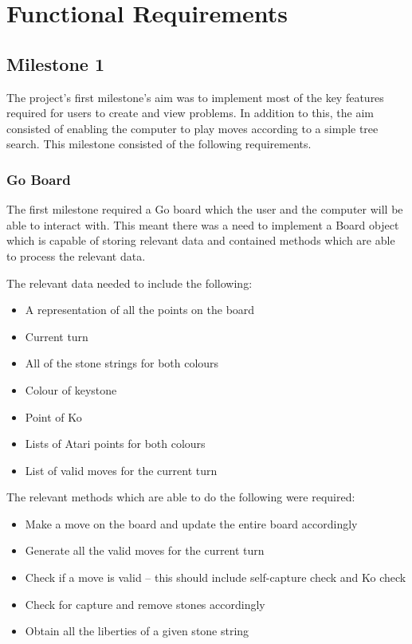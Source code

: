 \documentclass{l4proj}
\begin{document}
\section{Functional Requirements}

\subsection{Milestone 1}
The project's first milestone's aim was to implement most of the key features required for users to create and view problems. In addition to this, the aim consisted of enabling the computer to play moves according to a simple tree search. This milestone consisted of the following requirements.

\subsubsection{Go Board}
The first milestone required a Go board which the user and the computer will be able to interact with. This meant there was a need to implement a Board object which is capable of storing relevant data and contained methods which are able to process the relevant data.

The relevant data needed to include the following:
\begin{itemize}
\item A representation of all the points on the board
\item Current turn
\item All of the stone strings for both colours
\item Colour of keystone
\item Point of Ko
\item Lists of Atari points for both colours
\item List of valid moves for the current turn
\end{itemize}

The relevant methods which are able to do the following were required:
\begin{itemize}
\item Make a move on the board and update the entire board accordingly
\item Generate all the valid moves for the current turn
\item Check if a move is valid – this should include self-capture check and Ko check
\item Check for capture and remove stones accordingly
\item Obtain all the liberties of a given stone string
\end{itemize}
\end{document}
